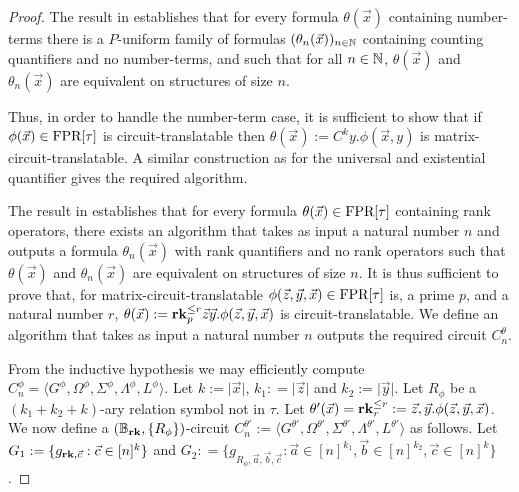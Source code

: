 \documentclass[../paper.tex]{subfiles}
\begin{document}
\begin{proof}
  The result in \cite{} establishes that for every formula $\theta(\vec{x})$
  containing number-terms there is a $P$-uniform family of formulas
  $(\theta_n(\vec{x}))_{n \in \mathbb{N}}$ containing counting quantifiers and no
  number-terms, and such that for all $n \in \mathbb{N}$, $\theta(\vec{x})$ and
  $\theta_n(\vec{x})$ are equivalent on structures of size $n$.


  Thus, in order to handle the number-term case, it is sufficient to show that
  if $\phi(\vec{x}) \in \text{\upshape FPR}[\tau]$ is circuit-translatable then
  $\theta(\vec{x}) := C^{k}y. \phi(\vec{x}, y)$ is matrix-circuit-translatable.
  A similar construction as for the universal and existential quantifier gives
  the required algorithm.

  The result in \cite{} establishes that for every formula $\theta(\vec{x}) \in
  \text{\upshape FPR}[\tau]$ containing rank operators, there exists an algorithm that takes as
  input a natural number $n$ and outputs a formula $\theta_n(\vec{x})$ with rank
  quantifiers and no rank operators such that $\theta(\vec{x})$ and
  $\theta_n(\vec{x})$ are equivalent on structures of size $n$. It is thus
  sufficient to prove that, for matrix-circuit-translatable $\phi(\vec{z},
  \vec{y}, \vec{x}) \in \text{\upshape FPR}[\tau]$ is, a prime $p$, and a natural number $r$,
  $\theta(\vec{x}) := \text{\textbf{rk}}^{\leq r}_p \vec{z} \vec{y}. \phi(\vec{z}, \vec{y},
  \vec{x})$ is circuit-translatable. We define an algorithm that takes as input
  a natural number $n$ outputs the required circuit $C^{\theta}_n$.

  From the inductive hypothesis we may efficiently compute $C^{\phi}_n = \langle
  G^{\phi}, \Omega^{\phi}, \Sigma^{\phi}, \Lambda^{\phi}, L^{\phi} \rangle$. Let
  $k:= \vert \vec{x} \vert$, $k_1 : = \vert \vec{z} \vert$ and $k_2 := \vert
  \vec{y} \vert$. Let $R_\phi$ be a $(k_1 + k_2 + k)$-ary relation symbol not in
  $\tau$. Let $\theta'(\vec{x}) = \text{\textbf{rk}}^{\leq r}_r := \vec{z}, \vec{y}. \phi
  (\vec{z}, \vec{y}, \vec{x})$. We now define a $(\mathbb{B}_{\text{\textbf{rk}}}, \{
  R_{\phi} \})$-circuit $C^{\theta'}_n:= \langle G^{\theta'}, \Omega^{\theta'},
  \Sigma^{\theta'}, \Lambda^{\theta'}, L^{\theta'}\rangle$ as follows. Let $G_1
  := \{g_{\text{\textbf{rk}}, \vec{c}} : \vec{c} \in [n]^k\}$ and $G_2 : = \{ g_{R_{\phi},
    \vec{a}, \vec{b}, \vec{c}} : \vec{a} \in [n]^{k_1}, \vec{b} \in [n]^{k_2},
  \vec{c} \in [n]^{k}\}$.
  

\end{proof}
\end{document}
